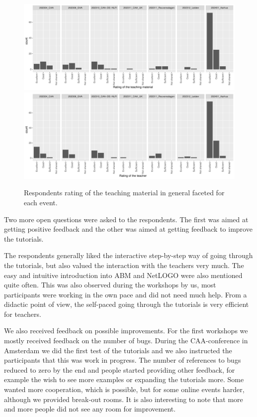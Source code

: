 \documentclass[
]{article}
\begin{document}
\begin{figure}
\includegraphics[height=0.5\textheight]{paper_files/figure-latex/rating-teaching-1} \includegraphics[height=0.5\textheight]{paper_files/figure-latex/rating-teaching-2} \caption{Respondents rating of the teaching material in general faceted for each event.}\label{fig:rating-teaching}
\end{figure}

Two more open questions were asked to the respondents. The first was aimed at getting positive feedback and the other was aimed at getting feedback to improve the tutorials.

The respondents generally liked the interactive step-by-step way of going through the tutorials, but also valued the interaction with the teachers very much. The easy and intuitive introduction into ABM and NetLOGO were also mentioned quite often. This was also observed during the workshops by us, most participants were working in the own pace and did not need much help. From a didactic point of view, the self-paced going through the tutorials is very efficient for teachers.

We also received feedback on possible improvements. For the first workshops we mostly received feedback on the number of bugs. During the CAA-conference in Amsterdam we did the first test of the tutorials and we also instructed the participants that this was work in progress. The number of references to bugs reduced to zero by the end and people started providing other feedback, for example the wish to see more examples or expanding the tutorials more. Some wanted more cooperation, which is possible, but for some online events harder, although we provided break-out rooms. It is also interesting to note that more and more people did not see any room for improvement.
\end{document}
